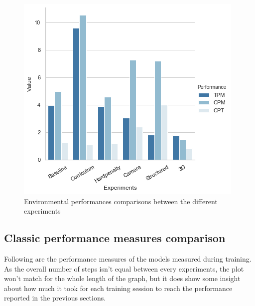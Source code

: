 \documentclass{ifacconf}
\begin{document}
\begin{figure}[!h]
\begin{center}
\includegraphics[width=\linewidth]{res/performances.png} 
\caption{Environmental performances comparisons between the different experiments} 
\label{fig:envperf}
\end{center}
\end{figure}

\subsection{Classic performance measures comparison}
Following are the performance measures of the models measured during training. As the overall number of steps isn't equal between every experiments, the plot won't match for the whole length of the graph, but it does show some insight about how much it took for each training session to reach the performance reported in the previous sections.
\end{document}
